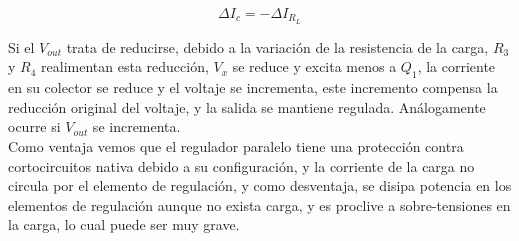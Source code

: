 \begin{equation*}
\Delta I_{c} = - \Delta I_{R_{L}}
\end{equation*}




Si el $V_{out}$ trata de reducirse, debido a la variación de la resistencia de la carga, $R_{3}$ y $R_{4}$ realimentan esta reducción, $V_{x}$ se reduce y excita menos a $Q_{1}$, la corriente en su colector se reduce y el voltaje se incrementa, este incremento compensa la reducción original del voltaje, y la salida se mantiene regulada. Análogamente ocurre si $V_{out}$ se incrementa.\\
Como ventaja vemos que el regulador paralelo tiene una protección contra cortocircuitos nativa debido a su configuración, y la corriente de la carga no circula por el elemento de regulación, y como desventaja, se disipa potencia en los elementos de regulación aunque no exista carga, y es proclive a sobre-tensiones en la carga, lo cual puede ser muy grave.








\clearpage